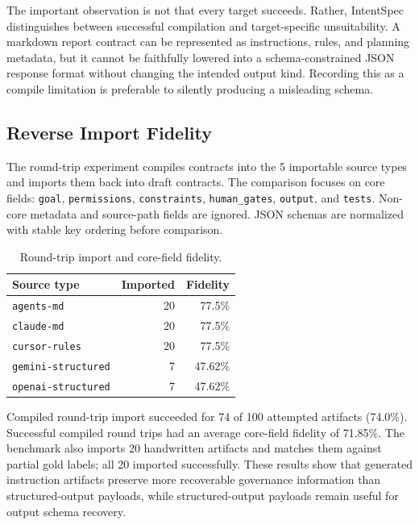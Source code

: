 \documentclass[11pt]{article}
\begin{document}
The important observation is not that every target succeeds. Rather, IntentSpec
distinguishes between successful compilation and target-specific unsuitability. A
markdown report contract can be represented as instructions, rules, and planning
metadata, but it cannot be faithfully lowered into a schema-constrained JSON
response format without changing the intended output kind. Recording this as a
compile limitation is preferable to silently producing a misleading schema.

\subsection{Reverse Import Fidelity}

The round-trip experiment compiles contracts into the 5 importable source types and
imports them back into draft contracts. The comparison focuses on core fields:
\texttt{goal}, \texttt{permissions}, \texttt{constraints}, \texttt{human\_gates},
\texttt{output}, and \texttt{tests}. Non-core metadata and source-path fields are
ignored. JSON schemas are normalized with stable key ordering before comparison.

\begin{table}[htbp]
\caption{Round-trip import and core-field fidelity.}
\label{tab:roundtrip}
\centering
\begin{tabular}{lrr}
\toprule
Source type & Imported & Fidelity \\
\midrule
\texttt{agents-md} & 20 & 77.5\% \\
\texttt{claude-md} & 20 & 77.5\% \\
\texttt{cursor-rules} & 20 & 77.5\% \\
\texttt{gemini-structured} & 7 & 47.62\% \\
\texttt{openai-structured} & 7 & 47.62\% \\
\bottomrule
\end{tabular}
\end{table}

Compiled round-trip import succeeded for 74 of 100 attempted artifacts (74.0\%).
Successful compiled round trips had an average core-field fidelity of 71.85\%. The
benchmark also imports 20 handwritten artifacts and matches them against partial gold
labels; all 20 imported successfully. These results show that generated instruction
artifacts preserve more recoverable governance information than structured-output
payloads, while structured-output payloads remain useful for output schema recovery.
\end{document}
